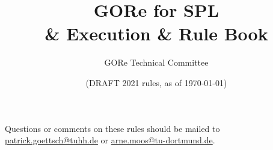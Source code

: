 \documentclass[12pt]{article}
\title{GORe for SPL\\ \& Execution \& Rule Book}
\author{GORe Technical Committee}
\date{(DRAFT 2021 rules, as of \today)}
\begin{document}
  \maketitle

  \begin{center}
  Questions or comments on these rules should be mailed to \\\url{patrick.goettsch@tuhh.de} or \url{arne.moos@tu-dortmund.de}.
  \end{center}

  \newpage

  \setcounter{tocdepth}{4}
  \setcounter{secnumdepth}{4}
  \tableofcontents

  \thispagestyle{fancy}

  \clearpage

  \cfoot{\thepage}
  \setcounter{page}{1}

  \newpage

  
  \newpage
  
  \newpage
  
\end{document}
